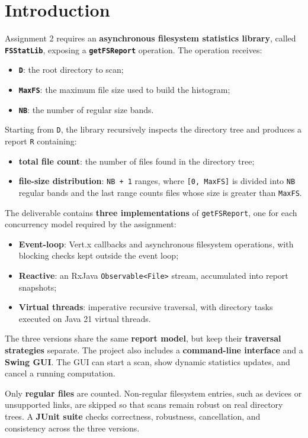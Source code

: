 \section{Introduction}

Assignment 2 requires an \textbf{asynchronous filesystem statistics library},
called \textbf{\texttt{FSStatLib}}, exposing a \textbf{\texttt{getFSReport}}
operation. The operation receives:

\begin{itemize}
  \item \textbf{\texttt{D}}: the root directory to scan;
  \item \textbf{\texttt{MaxFS}}: the maximum file size used to build the
  histogram;
  \item \textbf{\texttt{NB}}: the number of regular size bands.
\end{itemize}

Starting from \texttt{D}, the library recursively inspects the directory tree
and produces a report \texttt{R} containing:

\begin{itemize}
  \item \textbf{total file count}: the number of files found in the directory
  tree;
  \item \textbf{file-size distribution}: \texttt{NB + 1} ranges, where
  \texttt{[0, MaxFS]} is divided into \texttt{NB} regular bands and the last
  range counts files whose size is greater than \texttt{MaxFS}.
\end{itemize}

The deliverable contains \textbf{three implementations} of
\texttt{getFSReport}, one for each concurrency model required by the
assignment:

\begin{itemize}
  \item \textbf{Event-loop}: Vert.x callbacks and asynchronous filesystem
  operations, with blocking checks kept outside the event loop;
  \item \textbf{Reactive}: an RxJava \texttt{Observable<File>} stream,
  accumulated into report snapshots;
  \item \textbf{Virtual threads}: imperative recursive traversal, with
  directory tasks executed on Java 21 virtual threads.
\end{itemize}

The three versions share the same \textbf{report model}, but keep their
\textbf{traversal strategies} separate. The project also includes a
\textbf{command-line interface} and a \textbf{Swing GUI}. The GUI can
start a scan, show dynamic statistics updates, and cancel a running
computation.

Only \textbf{regular files} are counted. Non-regular filesystem entries, such
as devices or unsupported links, are skipped so that scans remain robust on
real directory trees. A \textbf{JUnit suite} checks correctness, robustness,
cancellation, and consistency across the three versions.
